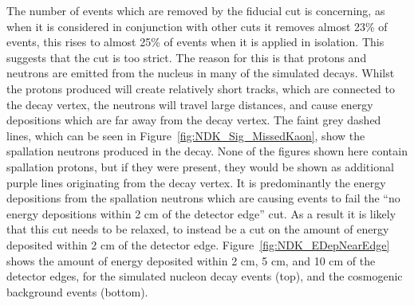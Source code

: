 The number of events which are removed by the fiducial cut is concerning, as when it is considered in conjunction with other cuts it removes almost 23\% of events, this rises to almost 25\% of events when it is applied in isolation. This suggests that the cut is too strict. The reason for this is that protons and neutrons are emitted from the nucleus in many of the simulated decays. Whilst the protons produced will create relatively short tracks, which are connected to the decay vertex, the neutrons will travel large distances, and cause energy depositions which are far away from the decay vertex. The faint grey dashed lines, which can be seen in Figure~\ref{fig:NDK_Sig_MissedKaon}, show the spallation neutrons produced in the decay. None of the figures shown here contain spallation protons, but if they were present, they would be shown as additional purple lines originating from the decay vertex. It is predominantly the energy depositions from the spallation neutrons which are causing events to fail the ``no energy depositions within 2 cm of the detector edge'' cut. As a result it is likely that this cut needs to be relaxed, to instead be a cut on the amount of energy deposited within 2 cm of the detector edge. Figure~\ref{fig:NDK_EDepNearEdge} shows the amount of energy deposited within 2 cm, 5 cm, and 10 cm of the detector edges, for the simulated nucleon decay events (top), and the cosmogenic background events (bottom). \\ 


